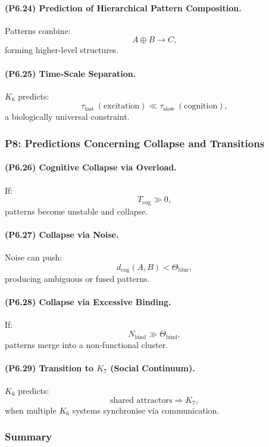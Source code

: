 \paragraph{(P6.24) Prediction of Hierarchical Pattern Composition.}
Patterns combine:
\[
A \oplus B \to C,
\]
forming higher-level structures.

\paragraph{(P6.25) Time-Scale Separation.}
$K_6$ predicts:
\[
\tau_{\mathrm{fast}} \ (\text{excitation}) \ll \tau_{\mathrm{slow}} \ (\text{cognition}),
\]
a biologically universal constraint.

\subsubsection{P8: Predictions Concerning Collapse and Transitions}

\paragraph{(P6.26) Cognitive Collapse via Overload.}
If:
\[
T_{\mathrm{cog}} \gg 0,
\]
patterns become unstable and collapse.

\paragraph{(P6.27) Collapse via Noise.}
Noise can push:
\[
d_{\mathrm{cog}}(A,B) < \Theta_{\mathrm{blur}},
\]
producing ambiguous or fused patterns.

\paragraph{(P6.28) Collapse via Excessive Binding.}
If:
\[
N_{\mathrm{bind}} \gg \Theta_{\mathrm{bind}},
\]
patterns merge into a non-functional cluster.

\paragraph{(P6.29) Transition to \texorpdfstring{$K_7$}{K_7} (Social Continuum).}
$K_6$ predicts:
\[
\text{shared attractors} \Rightarrow K_7,
\]
when multiple $K_6$ systems synchronise via communication.

\subsubsection{Summary}

